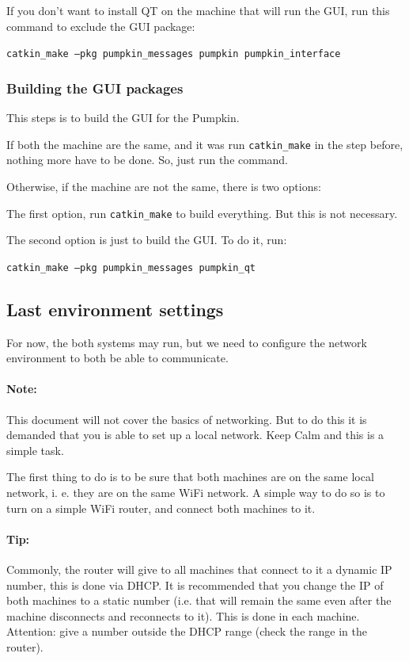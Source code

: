 \documentclass[oneside,a4paper,titlepage]{article}
\begin{document}
If you don't want to install QT on the machine that will run the GUI, run this command to exclude the GUI package:

\begin{center}
\texttt{catkin\_make --pkg pumpkin\_messages pumpkin pumpkin\_interface}
\end{center}

\subsubsection{Building the GUI packages}

This steps is to build the GUI for the Pumpkin.

If both the machine are the same, and it was run \texttt{catkin\_make} in the step before, nothing more have to be done. So, just run the command.

Otherwise, if the machine are not the same, there is two options:

The first option, run \texttt{catkin\_make} to build everything. But this is not necessary.

The second option is just to build the GUI. To do it, run:

\begin{center}
\texttt{catkin\_make --pkg pumpkin\_messages pumpkin\_qt}
\end{center}

\subsection{Last environment settings}

For now, the both systems may run, but we need to configure the network environment to both be able to communicate.

\paragraph{Note: } This document will not cover the basics of networking. But to do this it is demanded that you is able to set up a local network. Keep Calm and this is a simple task.

The first thing to do is to be sure that both machines are on the same local network, i. e. they are on the same WiFi network. A simple way to do so is to turn on a simple WiFi router, and connect both machines to it.

\paragraph{Tip: } Commonly, the router will give to all machines that connect to it a dynamic IP number, this is done via DHCP. It is recommended that you change the IP of both machines to a static number (i.e. that will remain the same even after the machine disconnects and reconnects to it). This is done in each machine. {\color{red}Attention: } give a number outside the DHCP range (check the range in the router).
\end{document}
